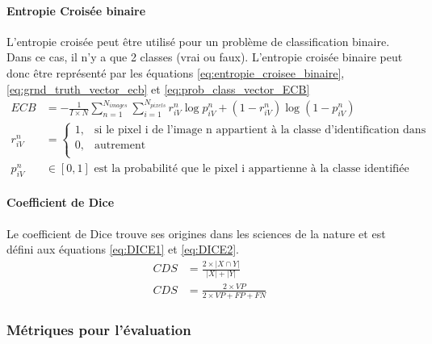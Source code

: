       \paragraph{Entropie Croisée binaire} L'entropie croisée peut être utilisé pour un problème de classification binaire. Dans ce cas, il n'y a que 2 classes (vrai ou faux). L'entropie croisée binaire peut donc être représenté par les équations \ref{eq:entropie_croisee_binaire}, \ref{eq:grnd_truth_vector_ecb} et \ref{eq:prob_class_vector_ECB}
      \begin{align}
        ECB & = -\frac{1}{I \times N} \sum_{n=1}^{N_{images}}\sum_{i=1}^{N_{pixels}}r^{n}_{iV} \log{p^{n}_{iV}} +
        (1-r^{n}_{iV}) \log{(1-p^{n}_{iV})} \label{eq:entropie_croisee_binaire}\\
        r^{n}_{iV} & = \begin{cases}
          1,& \mbox{si le pixel i de l'image n appartient à la classe d'identification dans l'annotation d'entrainement}\\
          0,& \mbox{autrement}\\ \end{cases}\label{eq:grnd_truth_vector_ecb}\\
        p^{n}_{iV} & \in [0,1]\mbox{ est la probabilité que le pixel i appartienne à la classe identifiée}\label{eq:prob_class_vector_ECB}
      \end{align}
      \paragraph{Coefficient de Dice} 
      Le coefficient de Dice trouve ses origines dans les sciences de la nature \parencite{Dice:MeasuresAmount:1945} et est défini aux équations \ref{eq:DICE1} et \ref{eq:DICE2}.
      \begin{align} 
        CDS & = \frac{2 \times \lvert X \cap Y \rvert}{\lvert X \rvert + \lvert Y \rvert}\label{eq:DICE1} \\
        CDS & = \frac{2 \times VP}{2 \times VP + FP + FN}\label{eq:DICE2}
      \end{align}
    \subsubsection{Métriques pour l'évaluation}
